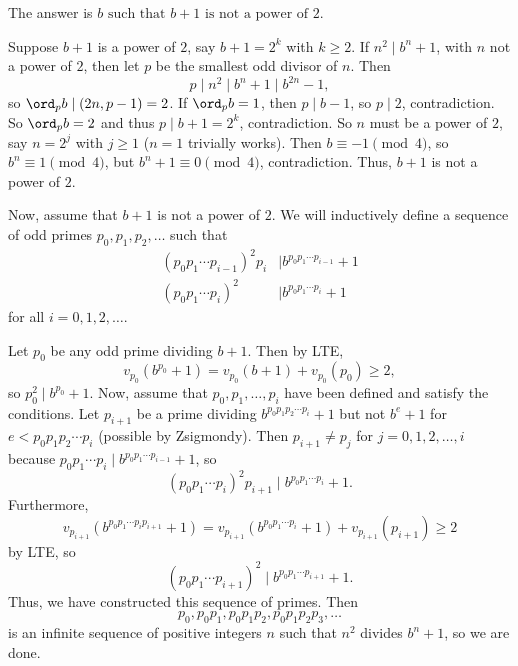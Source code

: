 The answer is $\boxed{b\text{ such that }b+1\text{ is not a power of }2}$.

Suppose $b+1$ is a power of $2$, say $b+1=2^k$ with $k\geq2$. If $n^2\mid b^n+1$, with $n$ not a power of $2$, then let $p$ be the smallest odd divisor of $n$. Then \[p\mid n^2\mid b^n+1\mid b^{2n}-1,\] so $\ord_pb\mid\left(2n,p-1\right)=2$. If $\ord_pb=1$, then $p\mid b-1$, so $p\mid2$, contradiction. So $\ord_pb=2$ and thus $p\mid b+1=2^k$, contradiction. So $n$ must be a power of $2$, say $n=2^j$ with $j\geq1$ ($n=1$ trivially works). Then $b\equiv-1\pmod4$, so $b^n\equiv1\pmod4$, but $b^n+1\equiv0\pmod4$, contradiction. Thus, $b+1$ is not a power of $2$.

Now, assume that $b+1$ is not a power of $2$. We will inductively define a sequence of odd primes $p_0,p_1,p_2,\ldots$ such that
\begin{align*}
	\left(p_0p_1\cdots p_{i-1}\right)^2p_i&\mid b^{p_0p_1\cdots p_{i-1}}+1\\
	\left(p_0p_1\cdots p_i\right)^2&\mid b^{p_0p_1\cdots p_i}+1
\end{align*}
for all $i=0,1,2,\ldots$.

Let $p_0$ be any odd prime dividing $b+1$. Then by LTE, \[v_{p_0}\left(b^{p_0}+1\right)=v_{p_0}\left(b+1\right)+v_{p_0}\left(p_0\right)\geq2,\] so $p_0^2\mid b^{p_0}+1$. Now, assume that $p_0,p_1,\ldots,p_i$ have been defined and satisfy the conditions. Let $p_{i+1}$ be a prime dividing $b^{p_0p_1p_2\cdots p_i}+1$ but not $b^e+1$ for $e<p_0p_1p_2\cdots p_i$ (possible by Zsigmondy). Then $p_{i+1}\neq p_j$ for $j=0,1,2,\ldots, i$ because $p_0p_1\cdots p_i\mid b^{p_0p_1\cdots p_{i-1}}+1$, so \[\left(p_0p_1\cdots p_i\right)^2p_{i+1}\mid b^{p_0p_1\cdots p_i}+1.\] Furthermore, \[v_{p_{i+1}}\left(b^{p_0p_1\cdots p_ip_{i+1}}+1\right)=v_{p_{i+1}}\left(b^{p_0p_1\cdots p_i}+1\right)+v_{p_{i+1}}\left(p_{i+1}\right)\geq2\] by LTE, so \[\left(p_0p_1\cdots p_{i+1}\right)^2\mid b^{p_0p_1\cdots p_{i+1}}+1.\] Thus, we have constructed this sequence of primes. Then \[p_0,p_0p_1,p_0p_1p_2,p_0p_1p_2p_3,\ldots\] is an infinite sequence of positive integers $n$ such that $n^2$ divides $b^n+1$, so we are done.